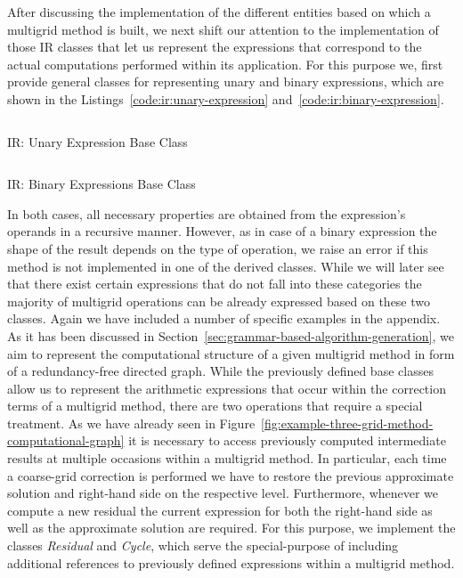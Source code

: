 After discussing the implementation of the different entities based on which a multigrid method is built, we next shift our attention to the implementation of those IR classes that let us represent the expressions that correspond to the actual computations performed within its application. 
For this purpose we, first provide general classes for representing unary and binary expressions, which are shown in the Listings~\ref{code:ir:unary-expression} and~\ref{code:ir:binary-expression}.
\begin{listing}
	\inputminted{python}{evostencils/ir/unary_expression.py}
	\caption{IR: Unary Expression Base Class}
	\label{code:ir:unary-expression}
\end{listing}
\begin{listing}
	\inputminted{python}{evostencils/ir/binary_expression.py}
	\caption{IR: Binary Expressions Base Class}
	\label{code:ir:binary-expression}
\end{listing}
In both cases, all necessary properties are obtained from the expression's operands in a recursive manner.
However, as in case of a binary expression the shape of the result depends on the type of operation, we raise an error if this method is not implemented in one of the derived classes. 
While we will later see that there exist certain expressions that do not fall into these categories the majority of multigrid operations can be already expressed based on these two classes.
Again we have included a number of specific examples in the appendix.
As it has been discussed in Section~\ref{sec:grammar-based-algorithm-generation}, we aim to represent the computational structure of a given multigrid method in form of a redundancy-free directed graph. 
While the previously defined base classes allow us to represent the arithmetic expressions that occur within the correction terms of a multigrid method, there are two operations that require a special treatment.
As we have already seen in Figure~\ref{fig:example-three-grid-method-computational-graph} it is necessary to access previously computed intermediate results at multiple occasions within a multigrid method.
In particular, each time a coarse-grid correction is performed we have to restore the previous approximate solution and right-hand side on the respective level.
Furthermore, whenever we compute a new residual the current expression for both the right-hand side as well as the approximate solution are required.
For this purpose, we implement the classes \emph{Residual} and \emph{Cycle}, which serve the special-purpose of including additional references to previously defined expressions within a multigrid method.
